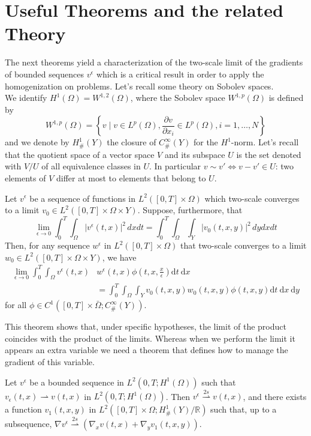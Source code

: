 \section{Useful Theorems and the related Theory}
The next theorems yield a characterization of the two-scale limit of the gradients of bounded sequences $v^{\epsilon}$ which is a critical result in order to apply the homogenization on problems. Let's recall some theory on Sobolev spaces.\\
We identify $H^{1}(\Omega)=W^{1,2}(\Omega)$, where the Sobolev space $W^{1, p}(\Omega)$ is defined by
$$
W^{1, p}(\Omega)=\left\{v \mid v \in L^{p}(\Omega), \frac{\partial v}{\partial x_{i}} \in L^{p}(\Omega), i=1, \ldots, N\right\}
$$and we denote by $H_{\#}^{1}(Y)$ the closure of $C_{\#}^{\infty}(Y)$ for the $H^{1}$-norm.
Let's recall that the quotient space of a vector space $V$ and its subspace $U$ is the set denoted with $V/U$ of all equivalence classes in $U$. In particular $v \sim v' \iff v-v'\in U$: two elements of $V$ differ at most to elements that belong to $U$.
\begin{theorem}
Let $v^{\epsilon}$ be a sequence of functions in $L^{2}([0, T] \times \Omega)$ which two-scale converges to a limit $v_{0} \in L^{2}([0, T] \times \Omega \times Y)$. Suppose, furthermore, that
$$
\lim _{\epsilon \rightarrow 0} \int_{0}^{T} \int_{\Omega}\left|v^{\epsilon}(t, x)\right|^{2} \, dxdt=\int_{0}^{T} \int_{\Omega} \int_{Y}\left|v_{0}(t, x, y)\right|^{2} \, dy dx dt
$$
Then, for any sequence $w^{\epsilon}$ in $L^{2}([0, T] \times \Omega)$ that two-scale converges to a limit $w_{0} \in L^{2}([0, T] \times \Omega \times Y)$, we have
$$
\begin{aligned}
\lim _{\epsilon \rightarrow 0} \int_{0}^{T} \int_{\Omega} v^{\epsilon}(t, x) & w^{\epsilon}(t, x) \phi\left(t, x, \frac{x}{\epsilon}\right) \mathrm{d} t \mathrm{~d} x \\
&=\int_{0}^{T} \int_{\Omega} \int_{Y} v_{0}(t, x, y) w_{0}(t, x, y) \phi(t, x, y) \mathrm{d} t \mathrm{~d} x \mathrm{~d} y
\end{aligned}
$$for all $\phi \in C^{1}\left([0, T] \times \bar{\Omega} ; C_{\#}^{\infty}(Y)\right)$.
\label{theorem 7.2}\end{theorem}
This theorem shows that, under specific hypotheses, the limit of the product coincides with the product of the limits. Whereas when we perform the limit it appears an extra variable we need a theorem that defines how to manage the gradient of this variable.
\begin{theorem}
Let $v^{\epsilon}$ be a bounded sequence in $L^{2}\left(0, T ; H^{1}(\Omega)\right)$ such that $v_{\epsilon}(t,x)\rightharpoonup v(t,x)$  in $L^{2}\left(0, T ; H^{1}(\Omega)\right)$. Then $v^{\epsilon} \overset{2s}{\rightharpoonup} v(t, x)$, and there exists a function $v_{1}(t, x, y)$ in $L^{2}\left([0, T] \times \Omega ; H_{\#}^{1}(Y) / \mathbb{R}\right)$ such that, up to a subsequence, $\nabla v^{\epsilon}  \overset{2s}{\rightharpoonup} \left(\nabla_{x} v(t, x)+\nabla_{y} v_{1}(t, x, y)\right)$. 
\label{theorem 7.3}\end{theorem}
